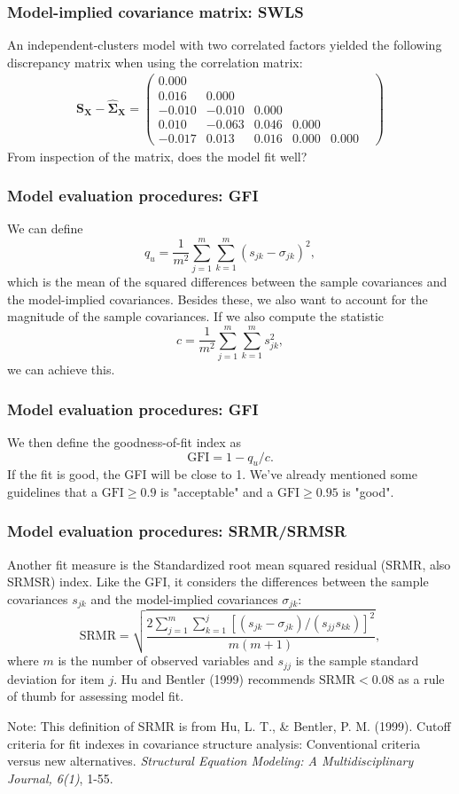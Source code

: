 \documentclass[compress]{beamer}
\begin{document}
\begin{frame}[fragile]
\frametitle{Model-implied covariance matrix: SWLS}
An independent-clusters model with two correlated factors yielded the following discrepancy matrix when using the correlation matrix:
\begin{align*}
\boldsymbol S_{\boldsymbol X}- \hat{\boldsymbol\Sigma}_{\boldsymbol X} = \begin{pmatrix} 
 0.000 & & & &                        \\  
 0.016 & 0.000 & & &                  \\ 
-0.010 &-0.010 & 0.000 & &          \\    
 0.010 &-0.063 & 0.046 & 0.000 & & \\     
-0.017 & 0.013 & 0.016 & 0.000 & 0.000
\end{pmatrix}
\end{align*}
From inspection of the matrix, does the model fit well?
\end{frame}


\begin{frame}[fragile]
\frametitle{Model evaluation procedures: GFI}
We can define
\[
q_u = \frac{1}{m^2}\sum_{j=1}^m\sum_{k=1}^m(s_{jk}-\sigma_{jk})^2,
\]
which is the mean of the squared differences between the sample covariances and the model-implied covariances. Besides these, we also want to account for the magnitude of the sample covariances. If we also compute the statistic
\[
c = \frac{1}{m^2}\sum_{j=1}^m\sum_{k=1}^ms_{jk}^2,
\]
we can achieve this. 
\end{frame}

\begin{frame}[fragile]
\frametitle{Model evaluation procedures: GFI}
We then define the goodness-of-fit index as
\[
\text{GFI} = 1 - q_u / c.
\]
If the fit is good, the GFI will be close to 1. We've already mentioned some guidelines that a $\text{GFI} \geq 0.9$ is "acceptable" and a $\text{GFI} \geq 0.95$ is "good".
\end{frame}

\begin{frame}[fragile]
\frametitle{Model evaluation procedures: SRMR/SRMSR}
Another fit measure is the Standardized root mean squared residual (SRMR, also SRMSR) index. Like the GFI, it considers the differences between the sample covariances $s_{jk}$ and the model-implied covariances ${\sigma}_{jk}$:
\[
\text{SRMR} = \sqrt{\frac{2\sum_{j=1}^m\sum_{k=1}^j\left[(s_{jk}- {\sigma}_{jk}) / (s_{jj}s_{kk})\right]^2}{m(m +1)}},
\]
where $m$ is the number of observed variables and $s_{jj}$ is the sample standard deviation for item $j$. Hu and Bentler (1999) recommends $\text{SRMR} < 0.08$ as a rule of thumb for assessing model fit.

\begin{small}%
Note: This definition of SRMR is from Hu, L. T., \& Bentler, P. M. (1999). Cutoff criteria for fit indexes in covariance structure analysis: Conventional criteria versus new alternatives. \textit{Structural Equation Modeling: A Multidisciplinary Journal, 6(1)}, 1-55.
\end{small}
\end{frame}
\end{document}
